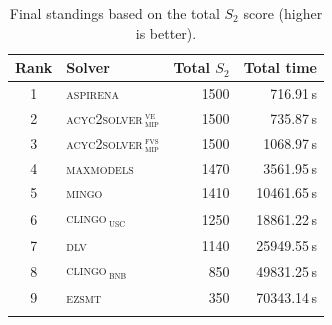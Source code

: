 \begin{table}[htbp]
\centering
\caption{Final standings based on the total $S_2$ score (higher is better).}
\label{tab:final-standings-s2}
\begin{tabular}{clrr}
\toprule
Rank & Solver & Total $S_2$ & Total time \\
\midrule
1 & \textsc{aspirena} & 1500 & 716.91\,s \\
2 & \textsc{acyc2solver\,$_{\text{mip}}^{\text{ve}}$} & 1500 & 735.87\,s \\
3 & \textsc{acyc2solver\,$_{\text{mip}}^{\text{fvs}}$} & 1500 & 1068.97\,s \\
4 & \textsc{maxmodels} & 1470 & 3561.95\,s \\
5 & \textsc{mingo} & 1410 & 10461.65\,s \\
6 & \textsc{clingo\,\textsubscript{usc}} & 1250 & 18861.22\,s \\
7 & \textsc{dlv} & 1140 & 25949.55\,s \\
8 & \textsc{clingo\,\textsubscript{bnb}} & 850 & 49831.25\,s \\
9 & \textsc{ezsmt} & 350 & 70343.14\,s \\
\botrule
\end{tabular}
\end{table}

